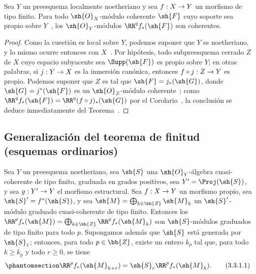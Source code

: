 \documentclass[oneside]{amsart}
\makeatletter
\renewcommand{\geq}{\geqslant}
\newcommand{\ega@arrow}[2]{\mathchoice{#1}{#2}{#2}{#2}}
\renewcommand{\to}{\ega@arrow{\longrightarrow}{\rightarrow}}
\newcommand{\oldpage}[2][]{{\marginnote{\normalfont\textbf{#1}~|~#2}}\ignorespaces}
\let\EGAOriginalLabel\label
\renewcommand{\label}[1]{\phantomsection\EGAOriginalLabel{#1}}
\makeatother
\begin{document}
\begin{corollary}[3.2.4]
\label{III.3.2.4}
Sea $Y$ un preesquema localmente noetheriano y sea $f:X\to Y$ un morfismo de tipo finito.
Para todo $\sh{O}_X$-módulo coherente $\sh{F}$ cuyo soporte sea propio sobre $Y$~, los $\sh{O}_Y$-módulos $\RR^q f_*(\sh{F})$ son coherentes.
\end{corollary}

\oldpage[III]{118}
\begin{proof}
Como la cuestión es local sobre $Y$, podemos suponer que $Y$ es noetheriano, y lo mismo ocurre entonces con $X$~.
Por hipótesis, todo subpreesquema cerrado $Z$ de $X$ cuyo espacio subyacente sea $\Supp(\sh{F})$ es propio sobre $Y$; en otras palabras, si $j:Y\to X$ es la inmersión canónica, entonces $f\circ j:Z\to Y$ es propio.
Podemos suponer que $Z$ es tal que $\sh{F}=j_*(\sh{G})$, donde $\sh{G}=j^*(\sh{F})$ es un $\sh{O}_Z$-módulo coherente~; como $\RR^q f_*(\sh{F})=\RR^q(f\circ j)_*(\sh{G})$ por el Corolario~, la conclusión se deduce inmediatamente del Teorema~.
\end{proof}

\subsection{Generalización del teorema de finitud (esquemas ordinarios)}
\label{subsection:III.3.3}

\begin{proposition}[3.3.1]
\label{III.3.3.1}
Sea $Y$ un preesquema noetheriano, sea $\sh{S}$ una $\sh{O}_Y$-álgebra cuasi-coherente de tipo finito, graduada en grados positivos, sea $Y'=\Proj(\sh{S})$, y sea $g:Y'\to Y$ el morfismo estructural.
Sea $f:X\to Y$ un morfismo propio, sea $\sh{S}'=f^*(\sh{S})$, y sea $\sh{M}=\bigoplus_{k\in\bb{Z}}\sh{M}_k$ un $\sh{S}'$-módulo graduado cuasi-coherente de tipo finito.
Entonces los $\RR^p f_*(\sh{M})=\bigoplus_{k\in\bb{Z}}\RR^p f_*(\sh{M}_k)$ son $\sh{S}$-módulos graduados de tipo finito para todo $p$.
Supongamos además que $\sh{S}$ está generada por $\sh{S}_1$; entonces, para todo $p\in\bb{Z}$, existe un entero $k_p$ tal que, para todo $k\geq k_p$ y todo $r\geq 0$, se tiene
\[
\label{III.3.3.1.1}
  \RR^p f_*(\sh{M}_{k+r})=\sh{S}_r\RR^p f_*(\sh{M}_k).
  \tag{3.3.1.1}
\] 
\end{proposition}
\end{document}

